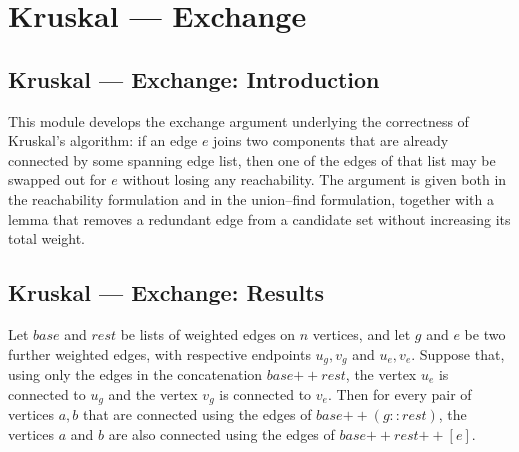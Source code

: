 \section{Kruskal --- Exchange}
\subsection*{Kruskal --- Exchange: Introduction}

This module develops the exchange argument underlying the correctness of Kruskal's
algorithm: if an edge $e$ joins two components that are already connected by some
spanning edge list, then one of the edges of that list may be swapped out for $e$
without losing any reachability. The argument is given both in the reachability
formulation and in the union--find formulation, together with a lemma that removes a
redundant edge from a candidate set without increasing its total weight.

\subsection*{Kruskal --- Exchange: Results}

\begin{lemma}
\label{Kruskal.exchange_take_head}
\leanok
{}
Let $\mathit{base}$ and $\mathit{rest}$ be lists of weighted edges on $n$ vertices, and
let $g$ and $e$ be two further weighted edges, with respective endpoints $u_g, v_g$ and
$u_e, v_e$. Suppose that, using only the edges in the concatenation $\mathit{base}
\mathbin{+\!\!+} \mathit{rest}$, the vertex $u_e$ is connected to $u_g$ and the vertex
$v_g$ is connected to $v_e$. Then for every pair of vertices $a, b$ that are connected
using the edges of $\mathit{base} \mathbin{+\!\!+} (g :: \mathit{rest})$, the vertices
$a$ and $b$ are also connected using the edges of $\mathit{base} \mathbin{+\!\!+}
\mathit{rest} \mathbin{+\!\!+} [e]$.
\end{lemma}

